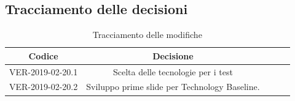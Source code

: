 \documentclass[12pt]{article}
\begin{document}
\begin{itemize}
    \subsection{Tracciamento delle decisioni}
    \begin{table}[!h] %
            \centering
            \renewcommand{\arraystretch}{2}
            \begin{tabular}{|c|c|p{6cm}|l|l|} %
                \rowcolor{orange!50} %
        		\hline
        		\textbf{Codice} & \textbf{Decisione}\\
                \hline
                VER-2019-02-20.1 & Scelta delle tecnologie per i test\\
                \hline
                VER-2019-02-20.2 & Sviluppo prime slide per Technology Baseline.\\
                \hline
        \end{tabular}
        \caption{Tracciamento delle modifiche} %
        \label{tab:Tracciamento delle modifiche}
        \end{table}
    \end{itemize}
\end{document}

